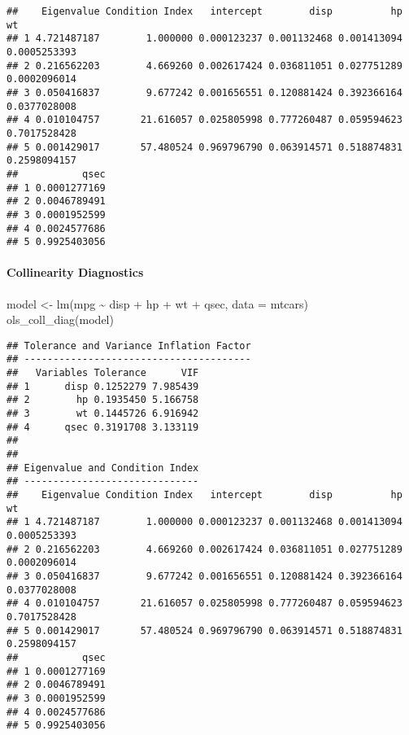 \documentclass[
]{article}
\newenvironment{Shaded}{\begin{snugshade}}{\end{snugshade}}
\newcommand{\AttributeTok}[1]{\textcolor[rgb]{0.77,0.63,0.00}{#1}}
\newcommand{\FunctionTok}[1]{\textcolor[rgb]{0.00,0.00,0.00}{#1}}
\newcommand{\NormalTok}[1]{#1}
\newcommand{\OtherTok}[1]{\textcolor[rgb]{0.56,0.35,0.01}{#1}}
\newcommand{\SpecialCharTok}[1]{\textcolor[rgb]{0.00,0.00,0.00}{#1}}
\begin{document}
\begin{verbatim}
##    Eigenvalue Condition Index   intercept        disp          hp           wt
## 1 4.721487187        1.000000 0.000123237 0.001132468 0.001413094 0.0005253393
## 2 0.216562203        4.669260 0.002617424 0.036811051 0.027751289 0.0002096014
## 3 0.050416837        9.677242 0.001656551 0.120881424 0.392366164 0.0377028008
## 4 0.010104757       21.616057 0.025805998 0.777260487 0.059594623 0.7017528428
## 5 0.001429017       57.480524 0.969796790 0.063914571 0.518874831 0.2598094157
##           qsec
## 1 0.0001277169
## 2 0.0046789491
## 3 0.0001952599
## 4 0.0024577686
## 5 0.9925403056
\end{verbatim}

\hypertarget{collinearity-diagnostics-2}{%
\paragraph{Collinearity Diagnostics}\label{collinearity-diagnostics-2}}

\begin{Shaded}
\begin{Highlighting}[]
\NormalTok{model }\OtherTok{\textless{}{-}} \FunctionTok{lm}\NormalTok{(mpg }\SpecialCharTok{\textasciitilde{}}\NormalTok{ disp }\SpecialCharTok{+}\NormalTok{ hp }\SpecialCharTok{+}\NormalTok{ wt }\SpecialCharTok{+}\NormalTok{ qsec, }\AttributeTok{data =}\NormalTok{ mtcars)}
\FunctionTok{ols\_coll\_diag}\NormalTok{(model)}
\end{Highlighting}
\end{Shaded}

\begin{verbatim}
## Tolerance and Variance Inflation Factor
## ---------------------------------------
##   Variables Tolerance      VIF
## 1      disp 0.1252279 7.985439
## 2        hp 0.1935450 5.166758
## 3        wt 0.1445726 6.916942
## 4      qsec 0.3191708 3.133119
## 
## 
## Eigenvalue and Condition Index
## ------------------------------
##    Eigenvalue Condition Index   intercept        disp          hp           wt
## 1 4.721487187        1.000000 0.000123237 0.001132468 0.001413094 0.0005253393
## 2 0.216562203        4.669260 0.002617424 0.036811051 0.027751289 0.0002096014
## 3 0.050416837        9.677242 0.001656551 0.120881424 0.392366164 0.0377028008
## 4 0.010104757       21.616057 0.025805998 0.777260487 0.059594623 0.7017528428
## 5 0.001429017       57.480524 0.969796790 0.063914571 0.518874831 0.2598094157
##           qsec
## 1 0.0001277169
## 2 0.0046789491
## 3 0.0001952599
## 4 0.0024577686
## 5 0.9925403056
\end{verbatim}
\end{document}
